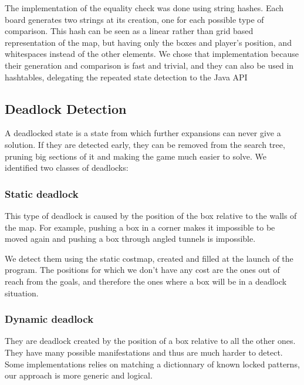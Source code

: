 \documentclass[a4paper,11pt]{article}
\begin{document}
The implementation of the equality check was done using string hashes. Each 
board generates two strings at its creation, one for each possible type of 
comparison. This hash can be seen as a linear rather than grid based 
representation of the map, but having only the boxes and player's position, 
and whitespaces instead of the other elements. We chose that implementation
because their generation and comparison is fast and trivial, and they can 
also be used in hashtables, delegating the repeated state detection to the 
Java API

\subsection{Deadlock Detection}

A deadlocked state is a state from which further expansions can never give a
solution. If they are detected early, they can be removed from the search tree,
pruning big sections of it and making the game much easier to solve. We 
identified two classes of deadlocks:

\subsubsection{Static deadlock}

This type of deadlock is caused by the position of the box relative to the 
walls of the map. For example, pushing a box in a corner makes it impossible
to be moved again and pushing a box through angled tunnels is impossible.

We detect them using the static costmap, created and filled at the launch of
the program. The positions for which we don't have any cost are the ones out
of reach from the goals, and therefore the ones where a box will be in a 
deadlock situation.

\subsubsection{Dynamic deadlock}

They are deadlock created by the position of a box relative to all the
other ones. They have many possible manifestations and thus are much
harder to detect. Some implementations relies on matching a
dictionnary of known locked patterns, our approach is more generic and
logical.
\end{document}
